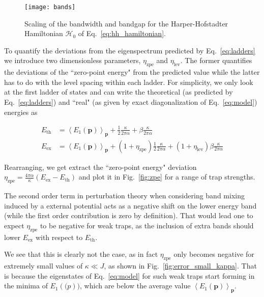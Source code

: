 \documentclass[twocolumn, 10pt, aps, superscriptaddress, floatfix, showpacs, pra, citeautoscript]{revtex4-1}
\newcommand{\vt}[1]{\mathbf{#1}}
\newcommand{\co}[2]{#2}
\renewcommand{\paragraph}{\co}
\begin{document}
\begin{figure}[htb]\centering
  \texttt{[image: bands]}
  \caption{Scaling of the bandwidth and bandgap for the
    Harper-Hofstadter Hamiltonian $\mathcal{H}_0$ of
    Eq.~\eqref{eq:hh_hamiltonian}.}
  \label{fig:energy_bands}
\end{figure}

To quantify the deviations from the eigenspectrum predicted by
Eq.~\eqref{eq:ladders} we introduce two dimensionless parameters,
$\eta_{\text{zpe}}$ and $\eta_{\text{lev}}$. The former quantifies the
deviations of the ``zero-point energy" from the predicted value while the
latter has to do with the level spacing within each ladder. For
simplicity, we only look at the first ladder of states and can write
the theoretical (as predicted by Eq.~\eqref{eq:ladders}) and ``real"
(as given by exact diagonalization of Eq.~\eqref{eq:model}) energies as

\begin{subequations}
  \begin{align}
    E_{\text{th}} &= \left<E_1(\vt{p})\right>_{\vt{p}} + \frac{1}{2}\frac{\kappa}{2\pi\alpha} + \beta \frac{\kappa}{2\pi\alpha}\\
    E_{\text{ex}} &= \left<E_1(\vt{p})\right>_{\vt{p}} +
          (1+\eta_{\text{zpe}})\frac{1}{2}\frac{\kappa}{2\pi\alpha} +
          (1+\eta_{\text{lev}})\beta \frac{\kappa}{2\pi\alpha}
  \end{align}   
\end{subequations}


Rearranging, we get extract the ``zero-point energy" deviation
$\eta_{\text{zpe}} = \frac{4\pi\alpha}{\kappa} (E_{\text{ex}} - E_{\text{th}})$ and plot
it in Fig.~\ref{fig:zpe} for a range of trap strengths.

\paragraph{There is a positive contribution to the zero point energy error.}  
The second order term in perturbation theory when considering band
mixing induced by a external potential acts as a negative shift on the
lower energy band (while the first order contribution is zero by
definition). That would lead one to expect $\eta_{\text{zpe}}$ to be
negative for weak traps, as the inclusion of extra bands should lower
$E_{\text{ex}}$ with respect to $E_{\text{th}}$.

\paragraph{Eigenstates for weak traps form in the minima of the band dispersion.}
We see that this is clearly not the case, as in fact
$\eta_{\text{zpe}}$ only becomes negative for extremely small values
of $\kappa \ll J$, as shown in Fig.~\ref{fig:error_small_kappa}.  That
is because the eigenstates of Eq.~\eqref{eq:model} for such weak
traps start forming in the minima of $E_1(\vt(p))$, which are below
the average value $\left<E_1(\vt{p})\right>_{\vt{p}}$.
\end{document}
